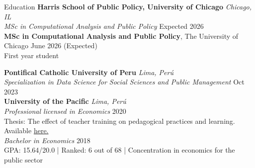 \documentclass{resume} %
\begin{document}
\begin{rSection}{Education}
    {\bf Harris School of Public Policy, University of Chicago} \hfill \textit{Chicago, IL} \\
    \textit{MSc in Computational Analysis and Public Policy} \hfill {Expected 2026} \\

    {\bf MSc in Computational Analysis and Public Policy}, The University of Chicago \hfill {June 2026 (Expected)} \\
    First year student

    \vspace{-15pt} %
    {\bf Pontifical Catholic University of Peru} \hfill \textit{Lima, Perú} \\
    \textit{Specialization in Data Science for Social Sciences and Public Management} \hfill {Oct 2023}\\

    \vspace{-15pt} %
    {\bf University of the Pacific} \hfill \textit{Lima, Perú} \\
    \textit{Professional licensed in Economics} \hfill {2020} \\
    Thesis: The effect of teacher training on pedagogical practices and learning. Available \href{https://repositorio.up.edu.pe/handle/11354/2653}{here.} \\

    \vspace{-15pt} %
    \textit{Bachelor in Economics} \hfill {2018} \\
    GPA: 15.64/20.0 | Ranked: 6 out of 68 | Concentration in economics for the public sector

\end{rSection}
\end{document}
